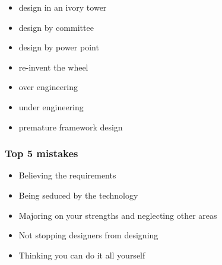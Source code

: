 \begin{itemize}
\tightlist
\item
  design in an ivory tower
\item
  design by committee
\item
  design by power point
\item
  re-invent the wheel
\item
  over engineering
\item
  under engineering
\item
  premature framework design
\end{itemize}

\hypertarget{top-5-mistakes}{%
\subsubsection{Top 5 mistakes}\label{top-5-mistakes}}

\begin{itemize}
\tightlist
\item
  Believing the requirements
\item
  Being seduced by the technology
\item
  Majoring on your strengths and neglecting other areas
\item
  Not stopping designers from designing
\item
  Thinking you can do it all yourself
\end{itemize}

\clearpage